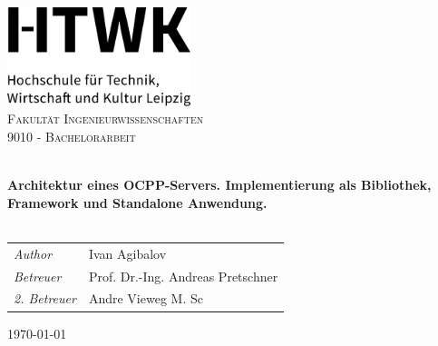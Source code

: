 
\begin{titlepage}
\vbox{ }
\vbox{ }
\begin{center}

\includegraphics[width=0.40\textwidth,center]{Images/HTWK_Zusatz_de_V_Black.jpg}\\[1cm]

\textsc{\LARGE Fakultät Ingenieurwissenschaften}\\[1.5cm]
\textsc{\Large 9010 - Bachelorarbeit}\\[0.5cm]
\vbox{ }

\HRule \\[0.4cm]
{ \huge \bfseries Architektur eines OCPP-Servers. 
Implementierung als Bibliothek, Framework und Standalone Anwendung.}\\[0.4cm]
\HRule \\[1.5cm]

\begin{table}[h]
\large
    \centering
    \begin{tabular}{ll}
        \emph{Author} & Ivan Agibalov \\
        \emph{Betreuer} & Prof. Dr.-Ing. Andreas Pretschner \\  
        \emph{2. Betreuer} & Andre Vieweg M. Sc
    \end{tabular}
\end{table}

\vfill
{\large \today}
\end{center}
\end{titlepage}
